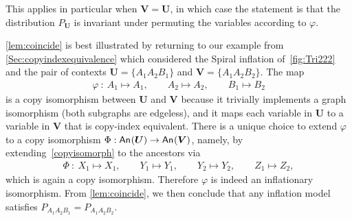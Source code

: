 {

This applies in particular when $\bm{V} = \bm{U}$, in which case the statement is that the distribution $P_{\bm{U}}$ is invariant under permuting the variables according to $\varphi$.

\cref{lem:coincide} is best illustrated by returning to our example from \cref{Sec:copyindexequivalence} 
which considered the Spiral inflation of~\cref{fig:Tri222} and the pair of contexts $\bm{U} = \{ A_1 A_2 B_1\}$ and $\bm{V} =\{ A_1 A_2 B_2\}$. The map 
\begin{align}\label{copyisomorph}
	\varphi \: : \: A_1 \mapsto A_1,\qquad A_2\mapsto A_2,\qquad B_1\mapsto B_2
\end{align}
is a copy isomorphism between $\bm{U}$ and $\bm{V}$
because it trivially implements a graph isomorphism (both subgraphs are edgeless), and it maps each variable in $\bm{U}$ to a variable in $\bm{V}$ that is copy-index equivalent. There is a unique choice to extend $\varphi$ to a copy isomorphism $\Phi:{\mathsf{An}_{}}\lparen\bm{U}\rparen\to{\mathsf{An}_{}}\lparen\bm{V}\rparen$, namely, by extending~\cref{copyisomorph} to the ancestors via
\begin{align}
\Phi \: : \: X_1\mapsto X_1,\qquad Y_1\mapsto Y_1, \qquad Y_2 \mapsto Y_2, \qquad Z_1 \mapsto Z_2,
\end{align}
which is again a copy isomorphism. 
Therefore $\varphi$ is indeed an inflationary isomorphism. From \cref{lem:coincide}, we then conclude that any inflation model satisfies $P_{A_1 A_2 B_1} = P_{A_1 A_2 B_2}$.

}
